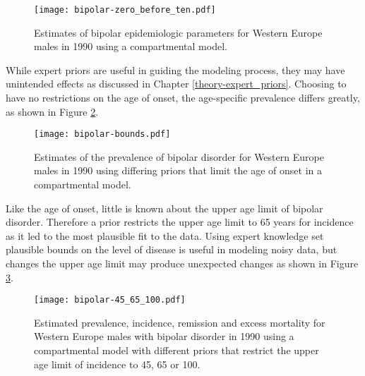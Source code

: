     \begin{figure}[h]
        \begin{center}
            \texttt{[image: bipolar-zero\_before\_ten.pdf]}
            \caption{Estimates of bipolar epidemiologic parameters for
              Western Europe males in 1990 using a compartmental
              model.}
            \label{fig:app-bipolar fit}
        \end{center}
    \end{figure}

While expert priors are useful in guiding the modeling process, they
may have unintended effects as discussed in Chapter
\ref{theory-expert_priors}.  Choosing to have no restrictions on the
age of onset, the age-specific prevalence differs greatly, as shown in
Figure \ref{fig:app-bipolar bounds}.

    \begin{figure}[h]
        \begin{center}
            \texttt{[image: bipolar-bounds.pdf]}
            \caption{Estimates of the prevalence of bipolar disorder
              for Western Europe males in 1990 using differing priors
              that limit the age of onset in a compartmental model.}
            \label{fig:app-bipolar bounds}
        \end{center}
    \end{figure}

Like the age of onset, little is known about the upper age limit of
bipolar disorder.  Therefore a prior restricts the upper age limit to
65 years for incidence as it led to the most plausible fit to the
data.  Using expert knowledge set plausible bounds on the level of
disease is useful in modeling noisy data, but changes the upper age
limit may produce unexpected changes as shown in Figure
\ref{fig:app-bipolar onset}.

    \begin{figure}[h]
        \begin{center}
            \texttt{[image: bipolar-45\_65\_100.pdf]}
            \caption{Estimated prevalence, incidence, remission and
              excess mortality for Western Europe males with bipolar
              disorder in 1990 using a compartmental model with
              different priors that restrict the upper age limit of
              incidence to 45, 65 or 100.}
            \label{fig:app-bipolar onset}
        \end{center}
    \end{figure}

